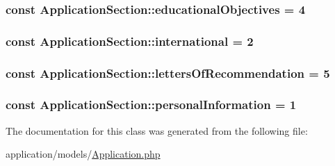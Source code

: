 \hypertarget{class_application_section_ab9dc9dc28ed62cb30f23364ba4a0c3a1}{
\subsubsection[{educational\-Objectives}]{\setlength{\rightskip}{0pt plus 5cm}const Application\-Section\-::educational\-Objectives = 4}}\label{class_application_section_ab9dc9dc28ed62cb30f23364ba4a0c3a1}
\hypertarget{class_application_section_a1e94e4df26ec3841fe4769e5a5ce2e0e}{
\subsubsection[{international}]{\setlength{\rightskip}{0pt plus 5cm}const Application\-Section\-::international = 2}}\label{class_application_section_a1e94e4df26ec3841fe4769e5a5ce2e0e}
\hypertarget{class_application_section_abdeadb9a28862222a367b07a4f2347a5}{
\subsubsection[{letters\-Of\-Recommendation}]{\setlength{\rightskip}{0pt plus 5cm}const Application\-Section\-::letters\-Of\-Recommendation = 5}}\label{class_application_section_abdeadb9a28862222a367b07a4f2347a5}
\hypertarget{class_application_section_a4ffe5fd237d50281ab1b19872a037a00}{
\subsubsection[{personal\-Information}]{\setlength{\rightskip}{0pt plus 5cm}const Application\-Section\-::personal\-Information = 1}}\label{class_application_section_a4ffe5fd237d50281ab1b19872a037a00}


The documentation for this class was generated from the following file\-:\begin{DoxyCompactItemize}
\item 
application/models/\hyperlink{_application_8php}{Application.\-php}\end{DoxyCompactItemize}
